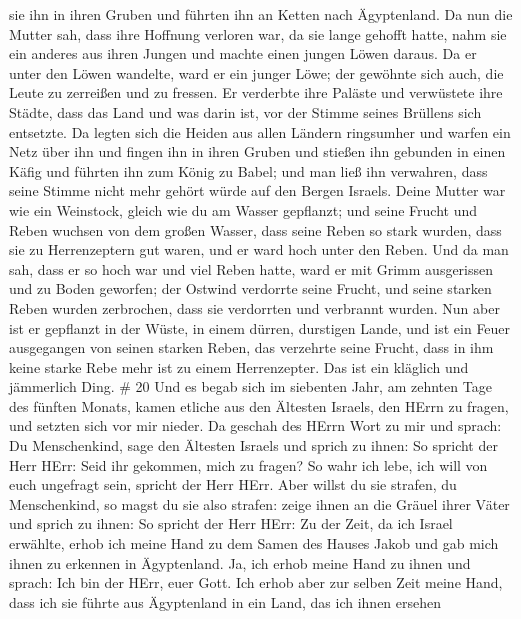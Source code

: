 sie ihn in ihren Gruben und führten ihn an Ketten nach Ägyptenland.
 Da nun die Mutter sah, dass ihre Hoffnung verloren war, da
sie lange gehofft hatte, nahm sie ein anderes aus ihren Jungen und
machte einen jungen Löwen daraus.  Da er unter den Löwen
wandelte, ward er ein junger Löwe; der gewöhnte sich auch, die Leute zu
zerreißen und zu fressen.  Er verderbte ihre Paläste und
verwüstete ihre Städte, dass das Land und was darin ist, vor der Stimme
seines Brüllens sich entsetzte.  Da legten sich die Heiden
aus allen Ländern ringsumher und warfen ein Netz über ihn und fingen ihn
in ihren Gruben  und stießen ihn gebunden in einen Käfig und
führten ihn zum König zu Babel; und man ließ ihn verwahren, dass seine
Stimme nicht mehr gehört würde auf den Bergen Israels. 
Deine Mutter war wie ein Weinstock, gleich wie du am Wasser gepflanzt;
und seine Frucht und Reben wuchsen von dem großen Wasser, 
dass seine Reben so stark wurden, dass sie zu Herrenzeptern gut waren,
und er ward hoch unter den Reben. Und da man sah, dass er so hoch war
und viel Reben hatte,  ward er mit Grimm ausgerissen und zu
Boden geworfen; der Ostwind verdorrte seine Frucht, und seine starken
Reben wurden zerbrochen, dass sie verdorrten und verbrannt wurden.
 Nun aber ist er gepflanzt in der Wüste, in einem dürren,
durstigen Lande,  und ist ein Feuer ausgegangen von seinen
starken Reben, das verzehrte seine Frucht, dass in ihm keine starke Rebe
mehr ist zu einem Herrenzepter. Das ist ein kläglich und jämmerlich
Ding. \# 20  Und es begab sich im siebenten Jahr, am zehnten
Tage des fünften Monats, kamen etliche aus den Ältesten Israels, den
HErrn zu fragen, und setzten sich vor mir nieder.  Da
geschah des HErrn Wort zu mir und sprach:  Du Menschenkind,
sage den Ältesten Israels und sprich zu ihnen: So spricht der Herr HErr:
Seid ihr gekommen, mich zu fragen? So wahr ich lebe, ich will von euch
ungefragt sein, spricht der Herr HErr.  Aber willst du sie
strafen, du Menschenkind, so magst du sie also strafen: zeige ihnen an
die Gräuel ihrer Väter  und sprich zu ihnen: So spricht der
Herr HErr: Zu der Zeit, da ich Israel erwählte, erhob ich meine Hand zu
dem Samen des Hauses Jakob und gab mich ihnen zu erkennen in
Ägyptenland. Ja, ich erhob meine Hand zu ihnen und sprach: Ich bin der
HErr, euer Gott.  Ich erhob aber zur selben Zeit meine Hand,
dass ich sie führte aus Ägyptenland in ein Land, das ich ihnen ersehen

